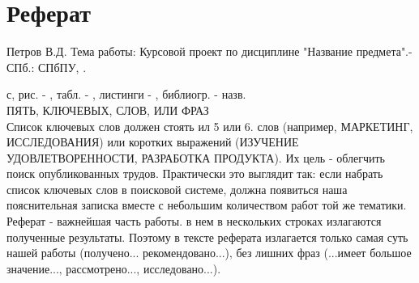 \section*{\centering Реферат}

Петров В.Д. Тема работы: Курсовой проект по дисциплине "Название предмета".- СПб.: СПбПУ, \the\year. \begin{NoHyper}{\pageref{LastPage}}\end{NoHyper}  с, рис. - \totalfigures{}, табл. - \totaltables{}, листинги - , библиогр. -  назв.\\[1cm]

ПЯТЬ, КЛЮЧЕВЫХ, СЛОВ, ИЛИ ФРАЗ\\

Список ключевых слов должен стоять ил 5 или 6. слов (например, МАРКЕТИНГ, ИССЛЕДОВАНИЯ) или коротких выражений (ИЗУЧЕНИЕ УДОВЛЕТВОРЕННОСТИ, РАЗРАБОТКА ПРОДУКТА). Их цель - облегчить поиск опубликованных трудов. Практически это выглядит так: если набрать список ключевых слов в поисковой системе, должна появиться наша пояснительная записка вместе с небольшим количеством работ той же тематики.\\

Реферат - важнейшая часть работы. в нем в нескольких строках излагаются полученные результаты. Поэтому в тексте реферата излагается только самая суть нашей работы (получено... рекомендовано...)‚ без лишних фраз (...имеет большое значение...‚ рассмотрено..., исследовано...).


\thispagestyle{empty} %
\newpage

